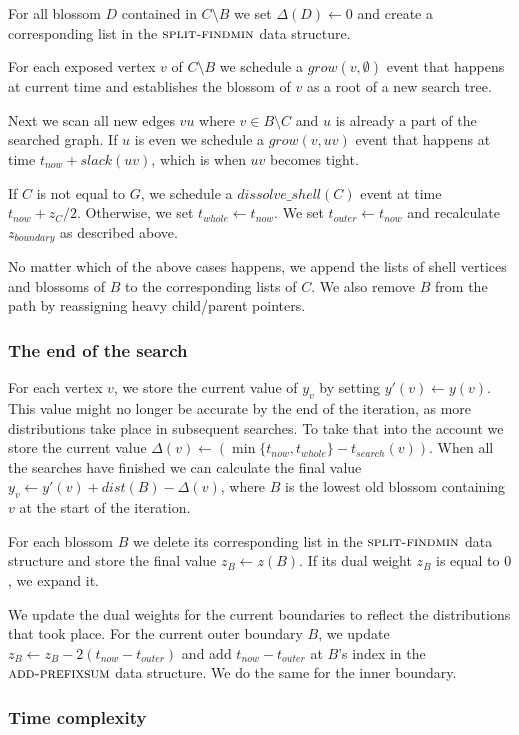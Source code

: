For all blossom $D$ contained in $C \setminus B$ we set $\Delta(D) \gets 0$ and create a corresponding list in the $\textsc{split-findmin}$ data structure.

For each exposed vertex $v$ of $C \setminus B$ we schedule a $grow(v, \emptyset)$ event that happens at current time and establishes the blossom of $v$ as a root of a new search tree.

Next we scan all new edges $vu$ where $v \in B \setminus C$ and $u$ is already a part of the  searched graph. If $u$ is even we schedule a $grow(v, uv)$ event that happens at time $t_{now} + slack(uv)$, which is when $uv$ becomes tight. 

If $C$ is not equal to $G$, we schedule a $dissolve\_shell(C)$ event at time $t_{now} + z_C / 2$. Otherwise, we set $t_{whole} \gets t_{now}$. We set $t_{outer} \gets t_{now}$ and recalculate $z_{boundary}$ as described above.

No matter which of the above cases happens, we append the lists of shell vertices and blossoms of $B$ to the corresponding lists of $C$. We also remove $B$ from the path by reassigning heavy child/parent pointers.

\subsubsection*{The end of the search} 
For each vertex $v$, we store the current value of $y_v$ by setting $y'(v) \gets y(v)$. This value might no longer be accurate by the end of the iteration, as more distributions take place in subsequent searches. To take that into the account we store the current value $\Delta(v) \gets (\min\{t_{now}, t_{whole}\} - t_{search}(v))$. When all the searches have finished we can calculate the final value $y_v \gets y'(v) + dist(B) - \Delta(v)$, where $B$ is the lowest old blossom containing $v$ at the start of the iteration.

For each blossom $B$ we delete its corresponding list in the $\textsc{split-findmin}$ data structure and store the final value $z_B \gets z(B)$. If its dual weight $z_B$ is equal to $0$, we expand it.

We update the dual weights for the current boundaries to reflect the distributions that took place. For the current outer boundary $B$, we update $z_B \gets z_B - 2(t_{now} - t_{outer})$ and add $t_{now} - t_{outer}$ at $B$'s index in the $\textsc{add-prefixsum}$ data structure. We do the same for the inner boundary.

\subsubsection*{Time complexity} 

